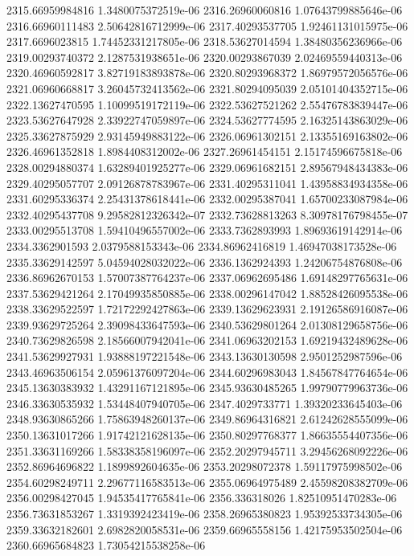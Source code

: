 {2315.66959984816 1.3480075372519e-06
2316.26960060816 1.07643799885646e-06
2316.66960111483 2.50642816712999e-06
2317.40293537705 1.92461131015975e-06
2317.6696023815 1.74452331217805e-06
2318.53627014594 1.38480356236966e-06
2319.00293740372 2.1287531938651e-06
2320.00293867039 2.02469559440313e-06
2320.46960592817 3.82719183893878e-06
2320.80293968372 1.86979572056576e-06
2321.06960668817 3.26045732413562e-06
2321.80294095039 2.05101404352715e-06
2322.13627470595 1.10099519172119e-06
2322.53627521262 2.55476783839447e-06
2323.53627647928 2.33922747059897e-06
2324.53627774595 2.16325143863029e-06
2325.33627875929 2.93145949883122e-06
2326.06961302151 2.13355169163802e-06
2326.46961352818 1.8984408312002e-06
2327.26961454151 2.15174596675818e-06
2328.00294880374 1.63289401925277e-06
2329.06961682151 2.89567948434383e-06
2329.40295057707 2.09126878783967e-06
2331.40295311041 1.43958834934358e-06
2331.60295336374 2.25431378618441e-06
2332.00295387041 1.65700233087984e-06
2332.40295437708 9.29582812326342e-07
2332.73628813263 8.30978176798455e-07
2333.00295513708 1.59410496557002e-06
2333.7362893993 1.89693619142914e-06
2334.3362901593 2.0379588153343e-06
2334.86962416819 1.46947038173528e-06
2335.33629142597 5.04594028032022e-06
2336.1362924393 1.24206754876808e-06
2336.86962670153 1.57007387764237e-06
2337.06962695486 1.69148297765631e-06
2337.53629421264 2.17049935850885e-06
2338.00296147042 1.88528426095538e-06
2338.33629522597 1.72172292427863e-06
2339.13629623931 2.19126586916087e-06
2339.93629725264 2.39098433647593e-06
2340.53629801264 2.01308129658756e-06
2340.73629826598 2.18566007942041e-06
2341.06963202153 1.69219432489628e-06
2341.53629927931 1.93888197221548e-06
2343.13630130598 2.9501252987596e-06
2343.46963506154 2.05961376097204e-06
2344.60296983043 1.84567847764654e-06
2345.13630383932 1.43291167121895e-06
2345.93630485265 1.99790779963736e-06
2346.33630535932 1.53448407940705e-06
2347.4029733771 1.39320233645403e-06
2348.93630865266 1.75863948260137e-06
2349.86964316821 2.61242628555099e-06
2350.13631017266 1.91742121628135e-06
2350.80297768377 1.86635554407356e-06
2351.33631169266 1.58338358196097e-06
2352.20297945711 3.29456268092226e-06
2352.86964696822 1.1899892604635e-06
2353.20298072378 1.59117975998502e-06
2354.60298249711 2.29677116583513e-06
2355.06964975489 2.45598208382709e-06
2356.00298427045 1.94535417765841e-06
2356.336318026 1.82510951470283e-06
2356.73631853267 1.3319392423419e-06
2358.26965380823 1.95392533734305e-06
2359.33632182601 2.6982820058531e-06
2359.66965558156 1.42175953502504e-06
2360.66965684823 1.73054215538258e-06
}
